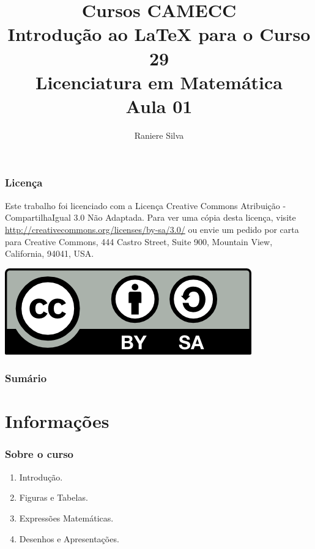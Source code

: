 \documentclass[12pt]{beamer}
\begin{document}
\title[Introdução ao LaTeX - 01/04]{Cursos CAMECC \\ Introdução ao LaTeX para o Curso 29 \\ Licenciatura em Matemática \\ Aula 01}
\author{Raniere Silva}
\begin{frame}
    \titlepage
\end{frame}

\begin{frame}
    \frametitle{Licença}
    Este trabalho foi licenciado com a Licença Creative Commons Atribuição - CompartilhaIgual 3.0 Não Adaptada. Para ver uma cópia desta licença, visite \url{http://creativecommons.org/licenses/by-sa/3.0/} ou envie um pedido por carta para Creative Commons, 444 Castro Street, Suite 900, Mountain View, California, 94041, USA.
    \begin{center}
        \includegraphics[keepaspectratio=true]{../../figures/cc-by-sa.png}
    \end{center}
\end{frame}

\begin{frame}
    \frametitle{Sumário}
    \tableofcontents
\end{frame}

\section{Informações}
\begin{frame}
    \frametitle{Sobre o curso}
    \begin{enumerate}
        \item Introdução.
        \item Figuras e Tabelas.
        \item Expressões Matemáticas.
        \item Desenhos e Apresentações.
    \end{enumerate}
\end{frame}
\end{document}
